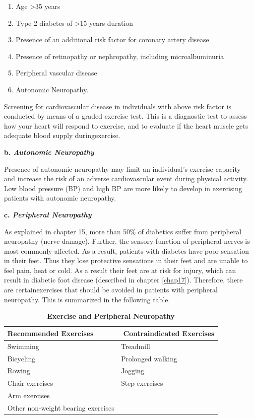 \begin{enumerate}[•]
\itemsep=0pt
\item Age \textgreater  35 years
\item Type 2 diabetes of \textgreater  15 years duration
\item Presence of an additional risk factor for coronary artery disease
\item Presence of retinopathy or nephropathy, including microalbuminuria
\item Peripheral vascular disease
\item Autonomic Neuropathy.
\end{enumerate}

Screening for cardiovascular disease in individuals with above risk factor is conducted by means of a graded exercise test. This is a dia\-gnostic test to assess how your heart will respond to exercise, and to evaluate if the heart muscle gets adequate blood supply during\break exercise.

\noindent\textbf{b. \textit{Autonomic Neuropathy}}

Presence of autonomic neuropathy may limit an individual’s exercise capacity and increase the risk of an adverse cardiovascular event during physical activity. Low blood pressure (BP) and high BP are more likely to develop in exercising patients with autonomic neuropathy.

\noindent\textbf{c. \textit{Peripheral Neuropathy}}

As explained in chapter 15, more than 50\% of diabetics suffer from peripheral neuropathy (nerve damage). Further, the sensory function of peripheral nerves is most commonly affected. As a result, patients with diabetes have poor sensation in their feet. Thus they lose prote\-ctive sensations in their feet and are unable to feel pain, heat or cold. As a result their feet are at risk for injury, which can result in diabetic foot disease (described in chapter \ref{chap17}). Therefore, there are certain\break exercises that should be avoided in patients with peripheral neuro\-pathy. This is summarized in the following table.

{
\begin{table}[H]
\centering
\caption*{\textbf{Exercise and Peripheral Neuropathy}}
\small\addtolength{\tabcolsep}{-3pt}
\begin{tabular}{|l|l|}
\hline
\qquad\textbf{Recommended Exercises} & \,\,\textbf{Contraindicated Exercises}\\
\hline
Swimming & Treadmill\\
\hline
Bicycling & Prolonged walking\\
\hline
Rowing & Jogging\\
\hline
Chair exercises & Step exercises\\
\hline
Arm exercises & \\
\hline
Other non-weight bearing exercises & \\
\hline
\end{tabular}
\end{table}
}\relax

